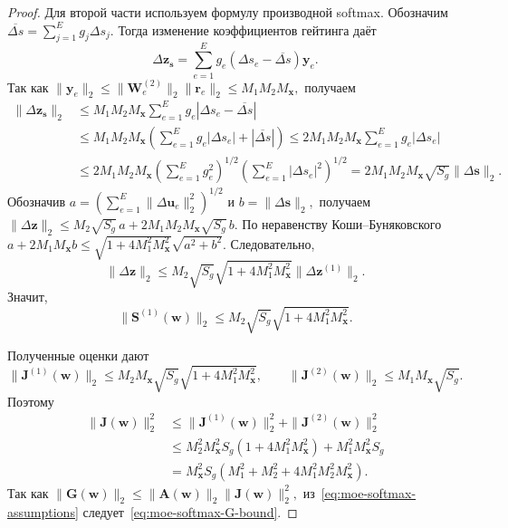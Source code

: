 \documentclass[11pt]{extarticle}
\theoremstyle{definition}
\theoremstyle{plain}
\theoremstyle{remark}
\begin{document}
\begin{proof}
Для второй части используем формулу производной softmax. Обозначим
$
\overline{\Delta s}
=
\sum\limits_{j=1}^{E}g_j\Delta s_j.
$
Тогда изменение коэффициентов гейтинга даёт
$$
\Delta\mathbf z_{\mathbf s}
=
\sum\limits_{e=1}^{E}
g_e(\Delta s_e-\overline{\Delta s})\mathbf y_e.
$$
Так как
$
\|\mathbf y_e\|_2
\le
\|\mathbf W_e^{(2)}\|_2\|\mathbf r_e\|_2
\le
M_1M_2M_{\mathbf x},
$
получаем
$$
\begin{aligned}
\|\Delta\mathbf z_{\mathbf s}\|_2
&\le
M_1M_2M_{\mathbf x}
\sum\limits_{e=1}^{E}
g_e|\Delta s_e-\overline{\Delta s}| \\
&\le
M_1M_2M_{\mathbf x}
\left(
\sum\limits_{e=1}^{E}g_e|\Delta s_e|
+
|\overline{\Delta s}|
\right) \leq
2M_1M_2M_{\mathbf x}
\sum\limits_{e=1}^{E}g_e|\Delta s_e| \\
&\le
2M_1M_2M_{\mathbf x}
\left(
\sum\limits_{e=1}^{E}g_e^2
\right)^{1/2}
\left(
\sum\limits_{e=1}^{E}|\Delta s_e|^2
\right)^{1/2}
=
2M_1M_2M_{\mathbf x}\sqrt{S_g}\|\Delta\mathbf s\|_2.
\end{aligned}
$$
Обозначив
$
a=\left(\sum\limits_{e=1}^{E}\|\Delta\mathbf u_e\|_2^2\right)^{1/2}
$
и
$
b=\|\Delta\mathbf s\|_2,
$
получаем
$
\|\Delta\mathbf z\|_2
\le
M_2\sqrt{S_g}\,a
+
2M_1M_2M_{\mathbf x}\sqrt{S_g}\,b.
$
По неравенству Коши--Буняковского
$
a+2M_1M_{\mathbf x}b
\le
\sqrt{1+4M_1^2M_{\mathbf x}^2}
\sqrt{a^2+b^2}.
$
Следовательно,
$$
\|\Delta\mathbf z\|_2
\le
M_2\sqrt{S_g}
\sqrt{1+4M_1^2M_{\mathbf x}^2}
\|\Delta\mathbf z^{(1)}\|_2.
$$
Значит,
$$
\|\mathbf S^{(1)}(\mathbf w)\|_2
\le
M_2\sqrt{S_g}
\sqrt{1+4M_1^2M_{\mathbf x}^2}.
$$

Полученные оценки дают
$$
\|\mathbf J^{(1)}(\mathbf w)\|_2
\le
M_2M_{\mathbf x}\sqrt{S_g}
\sqrt{1+4M_1^2M_{\mathbf x}^2},
\qquad
\|\mathbf J^{(2)}(\mathbf w)\|_2
\le
M_1M_{\mathbf x}\sqrt{S_g}.
$$
Поэтому
$$
\begin{aligned}
\|\mathbf J(\mathbf w)\|_2^2
&\le
\|\mathbf J^{(1)}(\mathbf w)\|_2^2
+
\|\mathbf J^{(2)}(\mathbf w)\|_2^2 \\
&\le
M_2^2M_{\mathbf x}^2S_g
\left(1+4M_1^2M_{\mathbf x}^2\right)
+
M_1^2M_{\mathbf x}^2S_g \\
&=
M_{\mathbf x}^2S_g
\left(
M_1^2+M_2^2+4M_1^2M_2^2M_{\mathbf x}^2
\right).
\end{aligned}
$$
Так как
$
\|\mathbf G(\mathbf w)\|_2
\le
\|\mathbf A(\mathbf w)\|_2\|\mathbf J(\mathbf w)\|_2^2,
$
из~\eqref{eq:moe-softmax-assumptions} следует~\eqref{eq:moe-softmax-G-bound}.
\end{proof}
\end{document}
